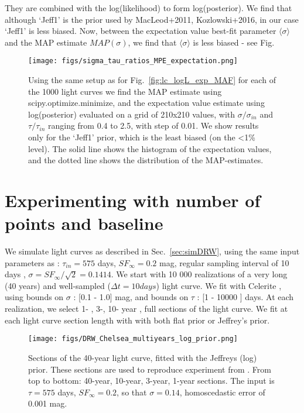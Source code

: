 \documentclass[fleqn,usenatbib]{mnras}  %
\begin{document}
They are combined with the log(likelihood) to form log(posterior). We find that although `Jeff1' is   the prior used by MacLeod+2011, Kozlowski+2016,  in our case `Jeff1' is less biased.  Now, between the expectation value best-fit parameter  $\langle \sigma\rangle$ and the MAP estimate $MAP(\sigma)$, we find that $\langle \sigma \rangle$ is less biased - see Fig. 

\begin{figure}
\texttt{[image: figs/sigma\_tau\_ratios\_MPE\_expectation.png]}
\caption{Using the same setup as for Fig.~\ref{fig:lc_logL_exp_MAF} for each of the 1000 light curves we find the MAP estimate using scipy.optimize.minimize, and the expectation value estimate using   log(posterior) evaluated on a grid of  210x210 values, with $\sigma/\sigma_{in}$ and $\tau/\tau_{in}$ ranging from 0.4 to 2.5, with step of 0.01. We show results only for the `Jeff1' prior, which is the least biased (on the <1\% level).  The solid line shows the histogram of the expectation values, and the dotted line shows the distribution of the MAP-estimates. }
\label{fig:exp_vs_MAP}
\end{figure} 


	

 

\section{Experimenting with number of points and baseline}

We simulate  light curves as described in Sec.~\ref{sec:simDRW}, using the same input parameters as \cite{macleod2011} : $\tau_{in} = 575 $ days, $SF_{\infty}= 0.2 $ mag, regular sampling interval of 10 days ,  $\sigma = SF_{\infty} / \sqrt{2} = 0.1414 $.  We start with 10 000 realizations of a very long (40 years)  and well-sampled  ($\Delta t = 10 days$) light curve.  We fit with Celerite , using bounds on $\sigma$ : [0.1 - 1.0] mag,  and bounds on $\tau$ : [1 - 10000 ] days. At each realization,  we select 1- , 3-, 10- year , full sections of the light curve. We fit at each light curve section length with   with both flat prior or Jeffrey's prior. 

\begin{figure}
\texttt{[image: figs/DRW\_Chelsea\_multiyears\_log\_prior.png]}
\caption{Sections of the 40-year light curve, fitted with the Jeffreys (log) prior. These sections are used to reproduce experiment from \citep{macleod2011}.  From top to bottom: 40-year, 10-year, 3-year, 1-year sections. The input is $\tau = 575$ days, $SF_{\infty} = 0.2$, so that $\sigma = 0.14$, homoscedastic error of 0.001 mag.  }
\label{fig:lc_sections}
\end{figure}
\end{document}
